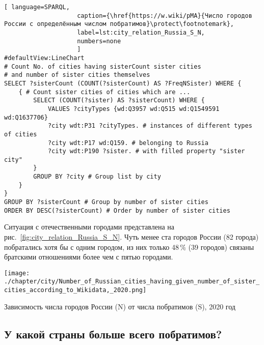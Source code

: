 \begin{lstlisting}[ language=SPARQL, 
                    caption={\href{https://w.wiki/pMA}{Число городов России с определённым числом побратимов}\protect\footnotemark},
                    label=lst:city_relation_Russia_S_N,
                    numbers=none
                    ]
#defaultView:LineChart                                                   
# Count No. of cities having sisterCount sister cities  
# and number of sister cities themselves
SELECT ?sisterCount (COUNT(?sisterCount) AS ?FreqNSister) WHERE {                                                                                  
	{ # Count sister cities of cities which are ...
		SELECT (COUNT(?sister) AS ?sisterCount) WHERE {    
			VALUES ?cityTypes {wd:Q3957 wd:Q515 wd:Q1549591 wd:Q1637706}
			?city wdt:P31 ?cityTypes. # instances of different types of cities
			?city wdt:P17 wd:Q159. # belonging to Russia
			?city wdt:P190 ?sister. # with filled property "sister city"
		}
		GROUP BY ?city # Group list by city                             
	}
}
GROUP BY ?sisterCount # Group by number of sister cities
ORDER BY DESC(?sisterCount) # Order by number of sister cities                                  
\end{lstlisting}

Ситуация с отечественными городами представлена на рис.~\ref{fig:city_relation_Russia_S_N}. 
Чуть менее ста городов России (82 города) побратались хотя бы с одним городом, 
из них только 48\,\% (39 городов) связаны братскими отношениями более чем с пятью городами.


\begin{marginfigure}[18pt]
    \texttt{[image: ./chapter/city/Number\_of\_Russian\_cities\_having\_given\_number\_of\_sister\_cities\_according\_to\_Wikidata,\_2020.png]}
  \caption[Зависимость числа городов России от числа побратимов, 2020 год.]
    {Зависимость числа городов России (N) от числа побратимов (S), 2020 год}
  \label{fig:city_relation_Russia_S_N}
\end{marginfigure}




\newpage
\subsection{У какой страны больше всего побратимов?}

